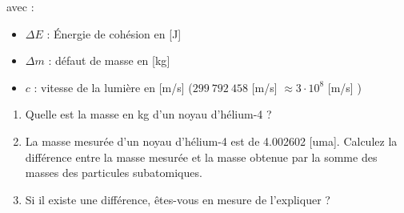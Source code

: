 \documentclass[
  11pt,
  a4paper,
  openany]{book}
\providecommand{\tightlist}{%
  \setlength{\itemsep}{0pt}\setlength{\parskip}{0pt}}
\begin{document}
avec :

\begin{itemize}
\tightlist
\item
  \(\Delta E\) : Énergie de cohésion en {[}J{]}\\
\item
  \(\Delta m\) : défaut de masse en {[}kg{]}\\
\item
  \(c\) : vitesse de la lumière en {[}m/s{]} (\(299\ 792\ 458\) {[}m/s{]} \(\approx 3 \cdot 10^8\) {[}m/s{]} )
\end{itemize}

\begin{Exercise}

\begin{enumerate}
\def\labelenumi{\arabic{enumi}.}
\tightlist
\item
  Quelle est la masse en kg d'un noyau d'hélium-4 ?\\
\item
  La masse mesurée d'un noyau d'hélium-4 est de 4.002602 {[}uma{]}. Calculez la différence entre la masse mesurée et la masse obtenue par la somme des masses des particules subatomiques.
\item
  Si il existe une différence, êtes-vous en mesure de l'expliquer ?
\end{enumerate}

\end{Exercise}
\end{document}
